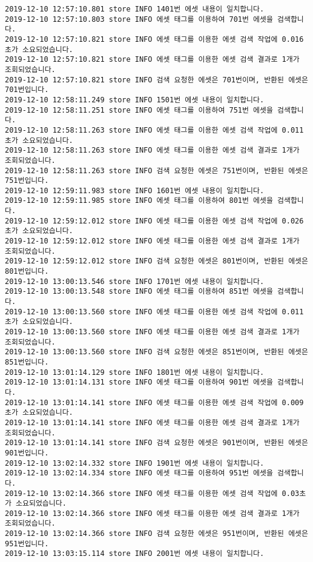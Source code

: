 \begin{Verbatim}[fontsize=\tiny, breaklines=true, breakanywhere=true]
2019-12-10 12:57:10.801 store INFO 1401번 에셋 내용이 일치합니다.
2019-12-10 12:57:10.803 store INFO 에셋 태그를 이용하여 701번 에셋을 검색합니다.
2019-12-10 12:57:10.821 store INFO 에셋 태그를 이용한 에셋 검색 작업에 0.016초가 소요되었습니다.
2019-12-10 12:57:10.821 store INFO 에셋 태그를 이용한 에셋 검색 결과로 1개가 조회되었습니다.
2019-12-10 12:57:10.821 store INFO 검색 요청한 에셋은 701번이며, 반환된 에셋은 701번입니다.
2019-12-10 12:58:11.249 store INFO 1501번 에셋 내용이 일치합니다.
2019-12-10 12:58:11.251 store INFO 에셋 태그를 이용하여 751번 에셋을 검색합니다.
2019-12-10 12:58:11.263 store INFO 에셋 태그를 이용한 에셋 검색 작업에 0.011초가 소요되었습니다.
2019-12-10 12:58:11.263 store INFO 에셋 태그를 이용한 에셋 검색 결과로 1개가 조회되었습니다.
2019-12-10 12:58:11.263 store INFO 검색 요청한 에셋은 751번이며, 반환된 에셋은 751번입니다.
2019-12-10 12:59:11.983 store INFO 1601번 에셋 내용이 일치합니다.
2019-12-10 12:59:11.985 store INFO 에셋 태그를 이용하여 801번 에셋을 검색합니다.
2019-12-10 12:59:12.012 store INFO 에셋 태그를 이용한 에셋 검색 작업에 0.026초가 소요되었습니다.
2019-12-10 12:59:12.012 store INFO 에셋 태그를 이용한 에셋 검색 결과로 1개가 조회되었습니다.
2019-12-10 12:59:12.012 store INFO 검색 요청한 에셋은 801번이며, 반환된 에셋은 801번입니다.
2019-12-10 13:00:13.546 store INFO 1701번 에셋 내용이 일치합니다.
2019-12-10 13:00:13.548 store INFO 에셋 태그를 이용하여 851번 에셋을 검색합니다.
2019-12-10 13:00:13.560 store INFO 에셋 태그를 이용한 에셋 검색 작업에 0.011초가 소요되었습니다.
2019-12-10 13:00:13.560 store INFO 에셋 태그를 이용한 에셋 검색 결과로 1개가 조회되었습니다.
2019-12-10 13:00:13.560 store INFO 검색 요청한 에셋은 851번이며, 반환된 에셋은 851번입니다.
2019-12-10 13:01:14.129 store INFO 1801번 에셋 내용이 일치합니다.
2019-12-10 13:01:14.131 store INFO 에셋 태그를 이용하여 901번 에셋을 검색합니다.
2019-12-10 13:01:14.141 store INFO 에셋 태그를 이용한 에셋 검색 작업에 0.009초가 소요되었습니다.
2019-12-10 13:01:14.141 store INFO 에셋 태그를 이용한 에셋 검색 결과로 1개가 조회되었습니다.
2019-12-10 13:01:14.141 store INFO 검색 요청한 에셋은 901번이며, 반환된 에셋은 901번입니다.
2019-12-10 13:02:14.332 store INFO 1901번 에셋 내용이 일치합니다.
2019-12-10 13:02:14.334 store INFO 에셋 태그를 이용하여 951번 에셋을 검색합니다.
2019-12-10 13:02:14.366 store INFO 에셋 태그를 이용한 에셋 검색 작업에 0.03초가 소요되었습니다.
2019-12-10 13:02:14.366 store INFO 에셋 태그를 이용한 에셋 검색 결과로 1개가 조회되었습니다.
2019-12-10 13:02:14.366 store INFO 검색 요청한 에셋은 951번이며, 반환된 에셋은 951번입니다.
2019-12-10 13:03:15.114 store INFO 2001번 에셋 내용이 일치합니다.

\end{Verbatim}
